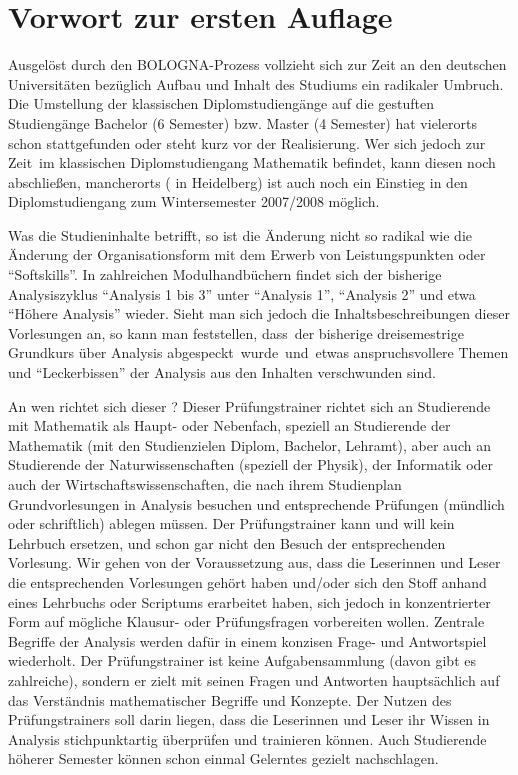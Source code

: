 \setcounter{page}{5}%
\chapter*{Vorwort zur ersten Auflage}

\vspace*{-5mm}
Ausgelöst durch den BOLOGNA-Prozess vollzieht sich zur Zeit an den deutschen 
Universitäten bezüglich Aufbau und Inhalt des Studiums ein radikaler Umbruch. 
Die Umstellung der klassischen Diplomstudiengänge auf die gestuften 
Studiengänge Bachelor (6 Semester) bzw. Master (4 Semester) hat 
vielerorts schon stattgefunden oder steht kurz vor der Realisierung. Wer sich 
jedoch zur Zeit~im klassischen Diplomstudiengang Mathematik befindet, kann 
diesen noch abschließen, mancherorts ({\zB} in Heidelberg) ist auch noch 
ein Einstieg in den Diplomstudiengang zum Wintersemester 2007/2008 möglich.

Was die Studieninhalte betrifft, so ist die Änderung nicht so radikal wie die 
Änderung der Organisationsform mit dem Erwerb von Leistungspunkten 
oder "`Softskills"'. In zahlreichen Modulhandbüchern findet sich der 
bisherige Analysiszyklus "`Analysis 1 bis 3"' unter "`Analysis 1"', 
"`Analysis 2"' und etwa "`Höhere Analysis"' wieder. 
Sieht man sich jedoch die Inhaltsbeschreibungen dieser Vorlesungen an, 
so kann man feststellen, 
dass~der bisherige dreisemestrige Grundkurs über Analysis 
abgespeckt~wur\-de~und~etwas anspruchsvollere Themen und "`Leckerbissen"' der Analysis aus den 
Inhalten verschwunden sind.

An wen richtet sich dieser ?
Dieser Prüfungstrainer richtet sich an Studierende mit Mathematik als Haupt- 
oder Nebenfach, speziell an Studieren\-de der Mathematik (mit den 
Studienzielen Diplom, Bachelor, Lehramt), aber auch an Studierende der 
Naturwissenschaften (speziell der Physik), der Informatik oder auch der 
Wirtschaftswissenschaften, die nach ihrem Studienplan Grundvorlesungen in 
Analysis besuchen und entsprechende Prüfungen (mündlich oder schriftlich) 
ablegen müssen. Der Prüfungstrainer kann und will kein Lehrbuch ersetzen, 
und schon gar nicht den Besuch der entsprechenden Vorlesung. Wir 
gehen von der Voraussetzung aus, dass die Leserinnen und Leser 
die entsprechenden 
Vorlesungen gehört haben {und/\-oder} sich den Stoff anhand eines Lehrbuchs oder 
Scriptums erarbeitet haben, sich jedoch in konzentrierter Form auf 
mögliche Klausur- oder Prüfungsfragen vorbereiten wollen.
Zentrale Begriffe der Analysis werden dafür in einem konzisen Frage- und 
Antwortspiel wiederholt. Der Prüfungstrainer ist keine Aufgabensammlung 
(davon gibt es zahlreiche), sondern er zielt mit seinen Fragen 
und Antworten hauptsächlich auf das Verständnis mathematischer Begriffe und 
Konzepte. Der Nutzen des Prüfungstrainers soll darin liegen, dass die 
Leserinnen und Leser ihr Wissen in Analysis stichpunktartig überprüfen und 
trainieren können. Auch Studierende höherer Semester können schon
 einmal Gelerntes gezielt nachschlagen.

